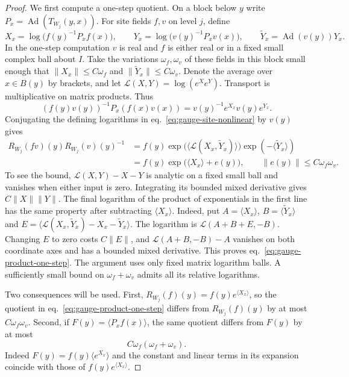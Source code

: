 \documentclass[11pt,letterpaper,reqno]{amsart}
\numberwithin{equation}{section}
\renewcommand{\eqref}[1]{\textup{eq.~\ref{#1}}}
\theoremstyle{definition}
\theoremstyle{remark}
\begin{document}
\begin{proof}
We first compute a one-step quotient. On a block below \(y\) write
\(P_x=\operatorname{Ad}(T_{W_j}(y,x))\). For site fields \(f,v\)
on level \(j\), define
\[
 X_x=\log\bigl(f(y)^{-1}P_x f(x)\bigr),\qquad
 Y_x=\log\bigl(v(y)^{-1}P_x v(x)\bigr),\qquad
 \widetilde Y_x=\operatorname{Ad}(v(y))Y_x .
\]
In the one-step computation \(v\) is real and \(f\) is either real
or in a fixed small complex ball about \(I\). Take the variations
\(\omega_f,\omega_v\) of these fields in this block small enough
that \(\|X_x\|\leq C\omega_f\) and
\(\|\widetilde Y_x\|\leq C\omega_v\). Denote the average over
\(x\in B(y)\) by brackets, and let
\(\mathcal L(X,Y)=\log(e^Xe^Y)\).
Transport is multiplicative on matrix products. Thus
\[
 (f(y)v(y))^{-1}P_x(f(x)v(x))
        = v(y)^{-1}e^{X_x}v(y)e^{Y_x}.
\]
Conjugating the defining logarithms in
\eqref{eq:gauge-site-nonlinear} by \(v(y)\) gives
\begin{equation}\label{eq:gauge-product-one-step}
 \begin{split}
 R_{W_j}(fv)(y)R_{W_j}(v)(y)^{-1}
   &= f(y)\exp\bigl(\langle\mathcal L(X_x,\widetilde Y_x)\rangle\bigr)
                    \exp(-\langle\widetilde Y_x\rangle)\\
   &= f(y)\exp\bigl(\langle X_x\rangle+e(y)\bigr),
       \qquad \|e(y)\|\leq C\omega_f\omega_v .
 \end{split}
\end{equation}
To see the bound, \(\mathcal L(X,Y)-X-Y\) is analytic on a
fixed small ball and vanishes when either input is zero. Integrating
its bounded mixed derivative gives \(C\|X\|\|Y\|\).
The final logarithm of the product of exponentials in the first
line has the same property after subtracting \(\langle X_x\rangle\).
Indeed, put
\(A=\langle X_x\rangle\), \(B=\langle\widetilde Y_x\rangle\)
and \(E=\langle\mathcal L(X_x,\widetilde Y_x)-X_x-
\widetilde Y_x\rangle\). The logarithm is
\(\mathcal L(A+B+E,-B)\). Changing \(E\) to zero costs
\(C\|E\|\), and \(\mathcal L(A+B,-B)-A\) vanishes on both
coordinate axes and has a bounded mixed derivative. This proves
\eqref{eq:gauge-product-one-step}. The argument uses only fixed
matrix logarithm balls. A sufficiently small bound on
\(\omega_f+\omega_v\) admits all its relative logarithms.

Two consequences will be used. First,
\(R_{W_j}(f)(y)=f(y)e^{\langle X_x\rangle}\), so the quotient in
\eqref{eq:gauge-product-one-step} differs from \(R_{W_j}(f)(y)\)
by at most \(C\omega_f\omega_v\). Second, if
\(F(y)=\langle P_xf(x)\rangle\), the same quotient differs from
\(F(y)\) by at most
\begin{equation}\label{eq:gauge-product-affine}
 C\omega_f(\omega_f+\omega_v).
\end{equation}
Indeed \(F(y)=f(y)\langle e^{X_x}\rangle\) and the constant and
linear terms in its expansion coincide with those of
\(f(y)e^{\langle X_x\rangle}\).


\end{proof}
\end{document}
